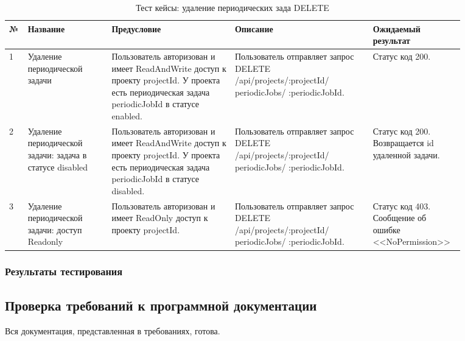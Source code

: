 \documentclass[a4paper,12pt]{article}
\begin{document}
	
	\begin{table}[hbt]
		\centering
		\begin{tabular}{|p{0.02\linewidth}|p{0.17\linewidth}|p{0.25\linewidth}|p{0.28\linewidth}|p{0.15\linewidth}|} 
			\hline
			\textbf{№} & \textbf{Название} & \textbf{Предусловие} & \textbf{Описание} & \textbf{Ожидаемый результат} \\ \hline
	
	        1 & Удаление периодической задачи & Пользователь авторизован и имеет ReadAndWrite доступ к проекту projectId. У проекта есть периодическая задача periodicJobId в статусе enabled. & Пользователь отправляет запрос DELETE   /api/projects/:projectId/ periodicJobs/ :periodicJobId. & Статус код 200. \\ \hline
	        
	        2 & Удаление периодической задачи: задача в статусе disabled  & Пользователь авторизован и имеет ReadAndWrite доступ к проекту projectId. У проекта есть периодическая задача periodicJobId в статусе disabled. & Пользователь отправляет запрос DELETE   /api/projects/:projectId/ periodicJobs/ :periodicJobId. & Статус код 200. Возвращается id удаленной задачи. \\ \hline
	        
	        3 & Удаление периодической задачи: доступ Readonly & Пользователь авторизован и имеет ReadOnly доступ к проекту projectId. & Пользователь отправляет запрос DELETE   /api/projects/:projectId/ periodicJobs/ :periodicJobId. & Статус код 403. Сообщение об ошибке <<NoPermission>> \\ \hline
	\end{tabular}
	\caption{Тест кейсы: удаление периодических зада DELETE}
	\end{table} 
	
	
	
	\clearpage
	\subsubsection{Результаты тестирования}
	
    
	
	\subsection{Проверка требований к программной документации}
	Вся документация, представленная в требованиях, готова.
	
\end{document}
